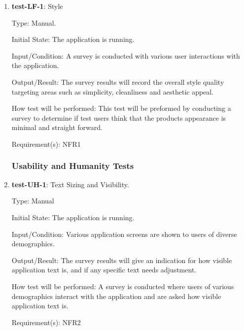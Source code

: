 \documentclass[12pt, titlepage]{article}
\begin{document}
	
	\begin{enumerate}
		
		
		
		
		
		
		
			
		\item{\textbf{test-LF-1}}: Style

		Type: Manual.
		
		Initial State: The application is running.
		
		Input/Condition: A survey is conducted with various user interactions with the application. 
		
		Output/Result: The survey results will record the overall style quality targeting areas such as simplicity, cleanliness and aesthetic appeal. 
		
		How test will be performed: This test will be preformed by conducting a survey to determine if test users think that the products appearance is minimal and straight forward.
		
		Requirement(s): NFR1
		
		

	
	\subsubsection{Usability and Humanity Tests}
		\item{\textbf{test-UH-1}}: Text Sizing and Visibility.
		
		Type: Manual
		
		Initial State: The application is running.
		
		Input/Condition: Various application screens are shown to users of diverse demographics.
		
		Output/Result: The survey results will give an indication for how visible application text is, and if any specific text needs adjustment.
		
		How test will be performed: A survey is conducted where users of various demographics interact with the application and are asked how visible application text is.
		
		Requirement(s): NFR2
		

\end{enumerate}
\end{document}

